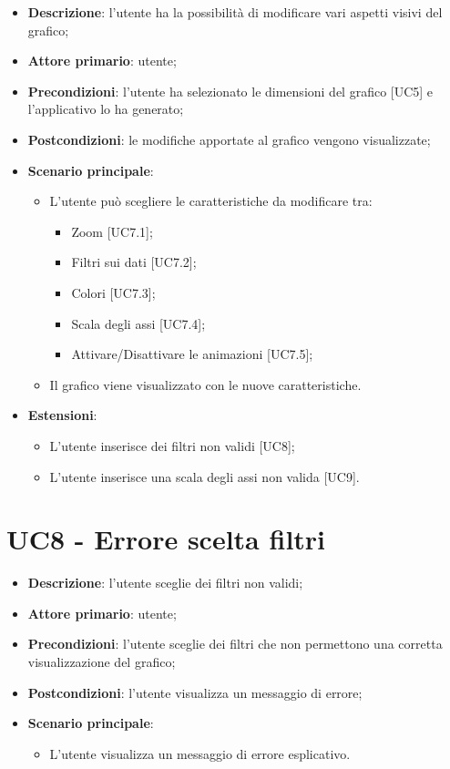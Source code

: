 \begin{itemize}
  \item \textbf{Descrizione}: l'utente ha la possibilità di modificare vari aspetti visivi del grafico;
  \item \textbf{Attore primario}: utente;
  \item \textbf{Precondizioni}: l'utente ha selezionato le dimensioni del grafico [UC5] e l'applicativo lo ha generato;
  \item \textbf{Postcondizioni}: le modifiche apportate al grafico vengono visualizzate;
  \item \textbf{Scenario principale}:
  \begin{itemize}
    \item L'utente può scegliere le caratteristiche da modificare tra:
      \begin{itemize}
        \item Zoom [UC7.1];
        \item Filtri sui dati [UC7.2];
        \item Colori [UC7.3];
        \item Scala degli assi [UC7.4];
        \item Attivare/Disattivare le animazioni [UC7.5];
      \end{itemize}
    \item Il grafico viene visualizzato con le nuove caratteristiche.
  \end{itemize}
  \item \textbf{Estensioni}:
    \begin{itemize}
      \item L'utente inserisce dei filtri non validi [UC8];
      \item L'utente inserisce una scala degli assi non valida [UC9].
    \end{itemize}
\end{itemize}

\section{UC8 - Errore scelta filtri}
\begin{itemize}
  \item \textbf{Descrizione}: l'utente sceglie dei filtri non validi;
  \item \textbf{Attore primario}: utente;
  \item \textbf{Precondizioni}: l'utente sceglie dei filtri che non permettono una corretta visualizzazione del grafico;
  \item \textbf{Postcondizioni}: l'utente visualizza un messaggio di errore;
  \item \textbf{Scenario principale}:
    \begin{itemize}
      \item L'utente visualizza un messaggio di errore esplicativo.
    \end{itemize}
\end{itemize}

